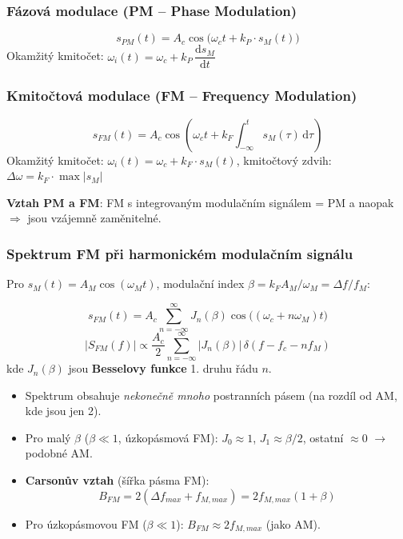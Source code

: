 \documentclass[12pt,a4paper]{article}
\newcommand{\dd}{\mathrm{d}}
\begin{document}
\subsubsection*{Fázová modulace (PM – Phase Modulation)}
\begin{matBox}[]
\[
  s_{PM}(t) = A_c\cos\!\bigl(\omega_c t + k_P\cdot s_M(t)\bigr)
\]
Okamžitý kmitočet: $\omega_i(t) = \omega_c + k_P\,\dfrac{\dd s_M}{\dd t}$
\end{matBox}

\subsubsection*{Kmitočtová modulace (FM – Frequency Modulation)}
\begin{matBox}[]
\[
  s_{FM}(t) = A_c\cos\!\left(\omega_c t + k_F\int_{-\infty}^{t} s_M(\tau)\,\dd\tau\right)
\]
Okamžitý kmitočet: $\omega_i(t) = \omega_c + k_F\cdot s_M(t)$, kmitočtový zdvih: $\Delta\omega = k_F\cdot\max|s_M|$
\end{matBox}

\textbf{Vztah PM a FM}: FM s integrovaným modulačním signálem = PM a naopak $\Rightarrow$ jsou vzájemně zaměnitelné.

\subsubsection*{Spektrum FM při harmonickém modulačním signálu}

Pro $s_M(t) = A_M\cos(\omega_M t)$, modulační index $\beta = k_F A_M / \omega_M = \Delta f / f_M$:

\begin{matBox}
\[
  s_{FM}(t) = A_c\sum_{n=-\infty}^{\infty} J_n(\beta)\cos\!\bigl((\omega_c + n\omega_M)t\bigr)
\]
\[
  |S_{FM}(f)| \propto \frac{A_c}{2}\sum_{n=-\infty}^{\infty} |J_n(\beta)|\,\delta(f - f_c - nf_M)
\]
kde $J_n(\beta)$ jsou \textbf{Besselovy funkce} 1. druhu řádu $n$.
\end{matBox}

\begin{itemize}
  \item Spektrum obsahuje \emph{nekonečně mnoho} postranních pásem (na rozdíl od AM, kde jsou jen 2).
  \item Pro malý $\beta$ ($\beta \ll 1$, úzkopásmová FM): $J_0 \approx 1$, $J_1 \approx \beta/2$, ostatní $\approx 0$ $\to$ podobné AM.
  \item \textbf{Carsonův vztah} (šířka pásma FM):
    \[
      B_{FM} = 2(\Delta f_{max} + f_{M,max}) = 2f_{M,max}(1 + \beta)
    \]
  \item Pro úzkopásmovou FM ($\beta \ll 1$): $B_{FM} \approx 2f_{M,max}$ (jako AM).
\end{itemize}
\end{document}
